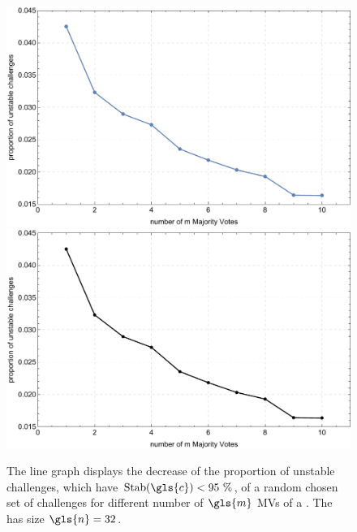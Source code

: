 \vspace{0.25cm}
\begin{figure}[ht]
\ifx{}\undefined
{}
\else
	\if{}
\centering
\includegraphics[width=1.00\textwidth]{images/single-votes-stab-simulation.pdf}
	\else
\includegraphics[width=1.00\textwidth]{images/single-votes-stab-simulation_mono.pdf}
    \fi
\fi
\caption[Decrease of unstable challenges of a \mpuf]{The line graph displays the decrease of the proportion of unstable challenges, which have $\Stab(\gls{c}) < 95\ \%$, of a random chosen set of challenges for different number of $\gls{m}$ \acp{MV} of a \mpuf.
The \mpuf has size $\gls{n} = 32$.
} %
\label{fig:majorityvotestabilityimprovement}
\end{figure}

